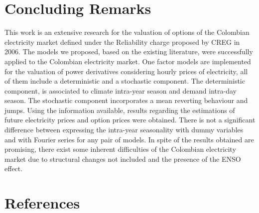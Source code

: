 \documentclass[3p]{elsarticle}
\begin{document}
\section{Concluding Remarks}\label{ch:Conclu}
This work is an extensive research for the valuation of options of the Colombian electricity market defined under the Reliability charge proposed by CREG in 2006. The models we proposed, based on the existing literature, were successfully applied to the Colombian electricity market. One factor models are implemented for the valuation of power derivatives considering hourly prices of electricity, all of them include a deterministic and a stochastic component. The deterministic component, is associated to climate intra-year season and demand intra-day season. The stochastic component incorporates a mean reverting behaviour and jumps. Using the information available, results regarding the estimations of future electricity prices and option prices were obtained. There is not a significant difference between expressing the intra-year seasonality with dummy variables and with Fourier series for any pair of models. In spite of the results obtained are promising, there exist some inherent difficulties of the Colombian electricity market due to structural changes not included and the presence of the ENSO effect.

\section*{References}


\end{document}
